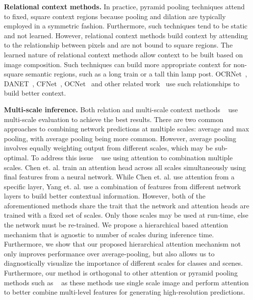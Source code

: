 \documentclass{article}
\begin{document}
\textbf{Relational context methods.} In practice, pyramid pooling techniques attend to fixed, square context regions because pooling and dilation are typically employed in a symmetric fashion. Furthermore, such techniques tend to be static and not learned. However, relational context methods build context by attending to the relationship between pixels and are not bound to square regions. The learned nature of relational context methods allow context to be built based on image composition. Such techniques can build more appropriate context for non-square semantic regions, such as a long train or a tall thin lamp post.
OCRNet~\cite{yuan2019objectcontextual}, DANET~\cite{fu2018dual}, CFNet~\cite{zhang2019co}, OCNet~\cite{yuan2018ocnet} and other related work~\cite{A2Net,Zhang_2019_ICCV,chen2018graph,NIPS2018_7456,li2018beyond,NIPS2018_7886,li19,huang2018ccnet} use such relationships to build better context. 

\textbf{Multi-scale inference.} Both relation and multi-scale context methods ~\cite{chen2017rethinking,chen2018encoderdecoder,cheng2019panopticdeeplab,yuan2019objectcontextual} use multi-scale evaluation to achieve the best results. There are two common approaches to combining network predictions at multiple scales: average and max pooling, with average pooling being more common. However, average pooling involves equally weighting output from different scales, which may be sub-optimal. To address this issue ~\cite{chen2015attention, yang2018attention} use using attention to combination multiple scales. Chen et. al. \cite{chen2015attention} train an attention head across all scales simultaneously using final features from a neural network. While Chen  et. al. use attention from a specific layer, Yang et. al. \cite{yang2018attention} use a combination of features from different network layers to build better contextual information. However, both of the aforementioned methods share the trait that the network and attention heads are trained with a fixed set of scales. Only those scales may be used at run-time, else the network must be re-trained. We propose a hierarchical based attention mechanism that is agnostic to number of scales during inference time. Furthermore, we show that our proposed hierarchical attention mechanism not only improves performance over average-pooling, but also allows us to diagnostically visualize the importance of different scales for classes and scenes. Furthermore, our method is orthogonal to other attention or pyramid pooling methods such as ~\cite{chen2018encoderdecoder,sinha2019multiscale,lin2016refinenet,yuan2019objectcontextual,Huang_2019_ICCV,fu2018dual,li2018pyramid} as these methods use single scale image and perform attention to better combine multi-level features for generating high-resolution predictions.
\end{document}
